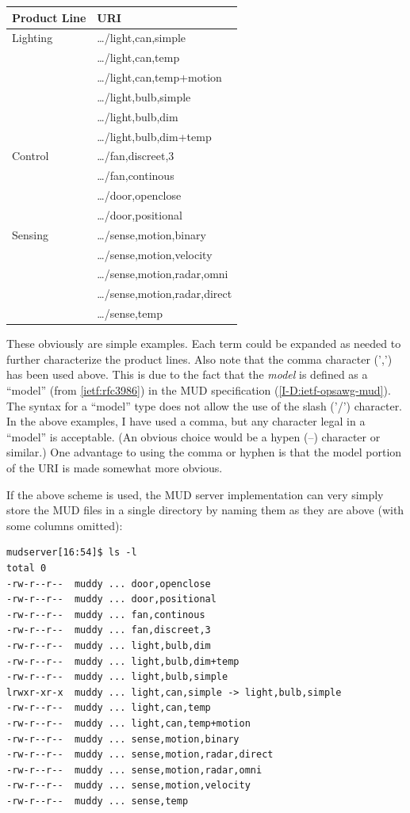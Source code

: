 \documentclass[conference]{IEEEtran}
\begin{document}
\begin{tabular}{l|>{\ttfamily\scriptsize}l}
  Product Line & URI \\ \hline
  Lighting & \ldots/light,can,simple \\
  & \ldots/light,can,temp \\
  & \ldots/light,can,temp+motion \\
  & \ldots/light,bulb,simple \\
  & \ldots/light,bulb,dim \\
  & \ldots/light,bulb,dim+temp \\
  Control & \ldots/fan,discreet,3 \\
  & \ldots/fan,continous \\
  & \ldots/door,openclose \\
  & \ldots/door,positional \\
  Sensing & \ldots/sense,motion,binary \\
  & \ldots/sense,motion,velocity \\
  & \ldots/sense,motion,radar,omni \\
  & \ldots/sense,motion,radar,direct \\
  & \ldots/sense,temp
\end{tabular}

These obviously are simple examples.  Each term could be expanded as
needed to further characterize the product lines.  Also note that the
comma character (',') has been used above.  This is due to the fact
that the {\em model} is defined as a ``model'' (from
\ref{ietf:rfc3986}) in the MUD specification
(\ref{I-D:ietf-opsawg-mud}).  The syntax for a ``model'' type does not
allow the use of the slash ('/') character.  In the above examples, I
have used a comma, but any character legal in a ``model'' is
acceptable.  (An obvious choice would be a hypen (--) character or
similar.)  One advantage to using the comma or hyphen is that the
model portion of the URI is made somewhat more obvious.

If the above scheme is used, the MUD server implementation can very
simply store the MUD files in a single directory by naming them as
they are above (with some columns omitted):

{\ttfamily\scriptsize
\begin{verbatim}
mudserver[16:54]$ ls -l
total 0
-rw-r--r--  muddy ... door,openclose
-rw-r--r--  muddy ... door,positional
-rw-r--r--  muddy ... fan,continous
-rw-r--r--  muddy ... fan,discreet,3
-rw-r--r--  muddy ... light,bulb,dim
-rw-r--r--  muddy ... light,bulb,dim+temp
-rw-r--r--  muddy ... light,bulb,simple
lrwxr-xr-x  muddy ... light,can,simple -> light,bulb,simple
-rw-r--r--  muddy ... light,can,temp
-rw-r--r--  muddy ... light,can,temp+motion
-rw-r--r--  muddy ... sense,motion,binary
-rw-r--r--  muddy ... sense,motion,radar,direct
-rw-r--r--  muddy ... sense,motion,radar,omni
-rw-r--r--  muddy ... sense,motion,velocity
-rw-r--r--  muddy ... sense,temp
\end{verbatim}
}
\end{document}
